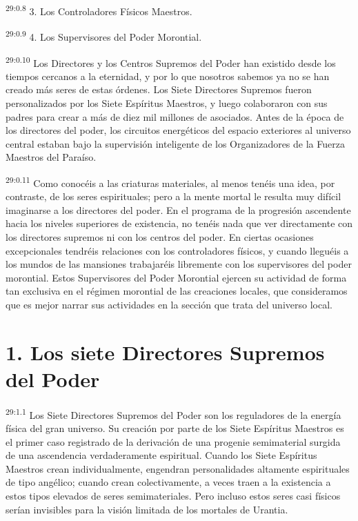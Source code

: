 \par
\textsuperscript{29:0.8} 3. Los Controladores Físicos Maestros.

\par
\textsuperscript{29:0.9} 4. Los Supervisores del Poder Morontial.

\par
\textsuperscript{29:0.10} Los Directores y los Centros Supremos del Poder han existido desde los tiempos cercanos a la eternidad, y por lo que nosotros sabemos ya no se han creado más seres de estas órdenes. Los Siete Directores Supremos fueron personalizados por los Siete Espíritus Maestros, y luego colaboraron con sus padres para crear a más de diez mil millones de asociados. Antes de la época de los directores del poder, los circuitos energéticos del espacio exteriores al universo central estaban bajo la supervisión inteligente de los Organizadores de la Fuerza Maestros del Paraíso.

\par
\textsuperscript{29:0.11} Como conocéis a las criaturas materiales, al menos tenéis una idea, por contraste, de los seres espirituales; pero a la mente mortal le resulta muy difícil imaginarse a los directores del poder. En el programa de la progresión ascendente hacia los niveles superiores de existencia, no tenéis nada que ver directamente con los directores supremos ni con los centros del poder. En ciertas ocasiones excepcionales tendréis relaciones con los controladores físicos, y cuando lleguéis a los mundos de las mansiones trabajaréis libremente con los supervisores del poder morontial. Estos Supervisores del Poder Morontial ejercen su actividad de forma tan exclusiva en el régimen morontial de las creaciones locales, que consideramos que es mejor narrar sus actividades en la sección que trata del universo local.

\section*{1. Los siete Directores Supremos del Poder}
\par
\textsuperscript{29:1.1} Los Siete Directores Supremos del Poder son los reguladores de la energía física del gran universo. Su creación por parte de los Siete Espíritus Maestros es el primer caso registrado de la derivación de una progenie semimaterial surgida de una ascendencia verdaderamente espiritual. Cuando los Siete Espíritus Maestros crean individualmente, engendran personalidades altamente espirituales de tipo angélico; cuando crean colectivamente, a veces traen a la existencia a estos tipos elevados de seres semimateriales. Pero incluso estos seres casi físicos serían invisibles para la visión limitada de los mortales de Urantia.

